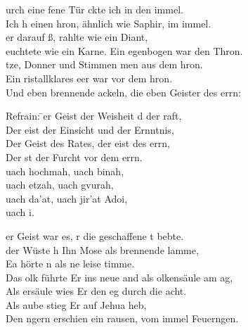 
urch eine fene Tür ckte ich in den immel.\\
Ich h einen hron, ähnlich wie Saphir, im immel.\\
er darauf ß, rahlte wie ein Diant,\\
euchtete wie ein Karne. Ein egenbogen war  den Thron.\\
tze, Donner und Stimmen men aus dem hron.\\
Ein ristallklares eer war vor dem hron.\\
Und eben brennende ackeln, die eben Geister des errn:
\begin{tabbing}
Refrain: \=   er Geist der Weisheit d der raft,\\
         \>              Der eist der Einsicht und der Ernntnis,\\
         \>              Der Geist des Rates, der eist des errn,\\
         \>              Der st der Furcht vor dem errn.\\
         \>    uach hochmah, uach binah,\\
         \>    uach etzah, uach gvurah,\\
         \>    uach da'at, uach jir'at Adoi,\\
         \>    uach i.
\end{tabbing} 
er Geist war es, r die geschaffene t bebte.\\
 der Wüste h Ihn Mose als brennende lamme,\\
Ea hörte n als ne leise timme.\\
Das olk führte Er ins neue and als olkensäule am ag,\\
Als ersäule wies Er den eg durch die acht.\\
Als aube stieg Er auf Jehua heb,\\
Den ngern erschien ein rausen, vom immel Feuerngen.\\

